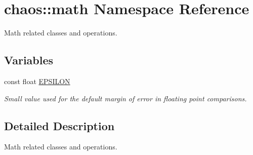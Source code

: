\hypertarget{namespacechaos_1_1math}{}\section{chaos\+:\+:math Namespace Reference}
\label{namespacechaos_1_1math}


Math related classes and operations.  


\subsection*{Variables}
\begin{DoxyCompactItemize}
\item 
\hypertarget{namespacechaos_1_1math_a592b0721bd50c7f638c5f09d6db661fe}{}const float \hyperlink{namespacechaos_1_1math_a592b0721bd50c7f638c5f09d6db661fe}{E\+P\+S\+I\+L\+O\+N}\label{namespacechaos_1_1math_a592b0721bd50c7f638c5f09d6db661fe}

\begin{DoxyCompactList}\small\item\em Small value used for the default margin of error in floating point comparisons. \end{DoxyCompactList}\end{DoxyCompactItemize}


\subsection{Detailed Description}
Math related classes and operations. 